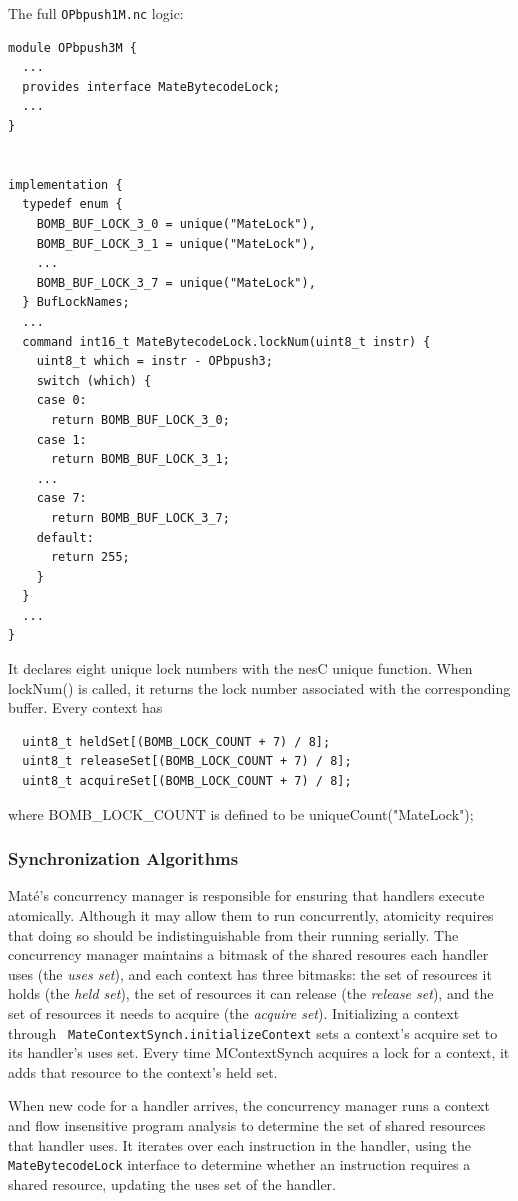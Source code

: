 \documentclass[12pt]{article}
\newcommand{\mate}{Mat\'{e}\xspace}
\begin{document}
The full {\tt OPbpush1M.nc} logic:

{\scriptsize
\begin{verbatim}
module OPbpush3M {
  ...
  provides interface MateBytecodeLock;
  ...
}


implementation {
  typedef enum {
    BOMB_BUF_LOCK_3_0 = unique("MateLock"),
    BOMB_BUF_LOCK_3_1 = unique("MateLock"),
    ...
    BOMB_BUF_LOCK_3_7 = unique("MateLock"),
  } BufLockNames;
  ...
  command int16_t MateBytecodeLock.lockNum(uint8_t instr) {
    uint8_t which = instr - OPbpush3;
    switch (which) {
    case 0:
      return BOMB_BUF_LOCK_3_0;
    case 1:
      return BOMB_BUF_LOCK_3_1;
    ...
    case 7:
      return BOMB_BUF_LOCK_3_7;
    default:
      return 255;
    }
  }
  ...
}
\end{verbatim}
}

It declares eight unique lock numbers with the nesC unique function. When
lockNum() is called, it returns the lock number associated with the
corresponding buffer. Every context has

{\scriptsize
\begin{verbatim}
  uint8_t heldSet[(BOMB_LOCK_COUNT + 7) / 8];
  uint8_t releaseSet[(BOMB_LOCK_COUNT + 7) / 8];
  uint8_t acquireSet[(BOMB_LOCK_COUNT + 7) / 8];
\end{verbatim}
}

where BOMB\_LOCK\_COUNT is defined to be uniqueCount("MateLock");

\subsubsection{Synchronization Algorithms}

\mate's concurrency manager is responsible for ensuring that handlers
execute atomically. Although it may allow them to run concurrently,
atomicity requires that doing so should be indistinguishable from
their running serially. The concurrency manager maintains a bitmask of
the shared resoures each handler uses (the {\it uses set}), and each
context has three bitmasks: the set of resources it holds (the {\it
held set}), the set of resources it can release (the {\it release
set}), and the set of resources it needs to acquire (the {\it acquire
set}). Initializing a context through {\tt
MateContextSynch.initializeContext} sets a context's acquire set to
its handler's uses set. Every time MContextSynch acquires a lock for a
context, it adds that resource to the context's held set.

When new code for a handler arrives, the concurrency manager runs a
context and flow insensitive program analysis to determine the set of
shared resources that handler uses. It iterates over each instruction
in the handler, using the {\tt MateBytecodeLock} interface to
determine whether an instruction requires a shared resource, updating
the uses set of the handler. 
\end{document}
